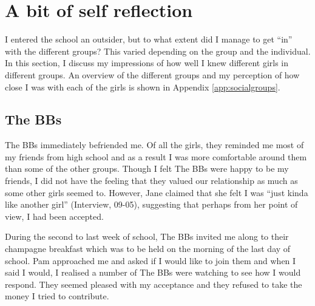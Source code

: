   


\section{A bit of self reflection}

I entered the school an outsider, but to what extent did I manage to get ``in'' with the different groups?  This varied depending on the group and the individual. In this section, I discuss my impressions of how well I knew different girls in different groups. An overview of the different groups and my perception of how close I was with each of the girls is shown in Appendix \ref{app:socialgroups}.

\subsection{The BBs}
The BBs immediately befriended me. Of all the girls, they reminded me most of my friends from high school and as a result I was more comfortable around them than some of the other groups. Though I felt The BBs were happy to be my friends, I did not have the feeling that they valued our relationship as much as some other girls seemed to. However, Jane claimed that she felt I was ``just kinda like another girl'' (Interview, 09-05), suggesting that perhaps from her point of view, I had been accepted.

During the second to last week of school, The BBs invited me along to their champagne breakfast which was to be held on the morning of the last day of school. Pam approached me and asked if I would like to join them and when I said I would, I realised a number of The BBs were watching to see how I would respond. They seemed pleased with my acceptance and they refused to take the money I tried to contribute. 

